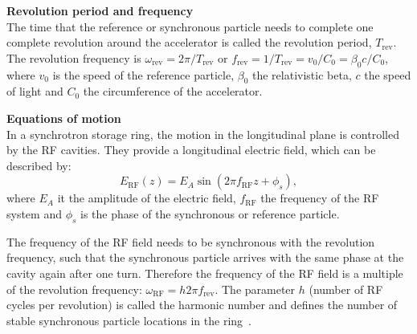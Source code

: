 \textbf{Revolution period and frequency}\\
The time that the reference or synchronous particle needs to complete one complete revolution around the accelerator is called the revolution period, $T_\mathrm{rev}$. The revolution frequency is $\omega_\mathrm{rev} = 2\pi /T_\mathrm{rev}$ or $f_\mathrm{rev}=1/T_\mathrm{rev} =  v_0/C_0 = \beta_0 c/C_0$, where $v_0$ is the speed of the reference particle, $\beta_0$ the relativistic beta, $c$ the speed of light and $C_0$ the circumference of the accelerator.

\textbf{Equations of motion}\\ %
In a synchrotron storage ring, the motion in the longitudinal plane is controlled by the RF cavities. They provide a longitudinal electric field, which can be described by:
\begin{equation}\label{eq:RF_cavity_EF}
    E_\mathrm{{RF}}(z) = E_A \sin{(2\pi f_\mathrm{RF}z + \phi_s)},
\end{equation}
where $E_A$ it the amplitude of the electric field, $f_\mathrm{RF}$ the frequency of the RF system and $\phi_s$ is the phase of the synchronous or reference particle.

The frequency of the RF field needs to be synchronous with the revolution frequency, such that the synchronous particle arrives with the same phase at the cavity again after one turn. Therefore the frequency of the RF field is a multiple of the revolution frequency: $\omega_\mathrm{RF}=h 2\pi f_\mathrm{rev}$. The parameter $h$ (number of RF cycles per revolution) is called the harmonic number and defines the number of stable synchronous particle locations in the ring~\cite{Tecker:2674860}.



